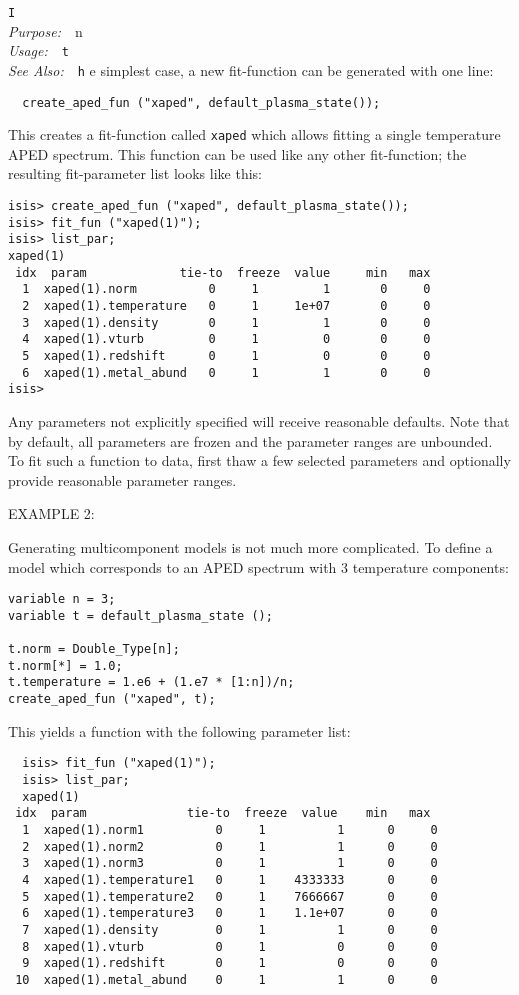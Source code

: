 \documentclass{book}
\makeatletter
\newif\ifpdf
\newenvironment{isisfunction}[4]%
{\index{{#1}@{\tt #1}}%
  \ifpdf
  \else
     \addcontentsline{toc}{subsection}{{#1} -- {#2}}
  \fi
  \vbox{
          \vspace*{\baselineskip}
          {\LARGE\tt #1}\vspace*{\baselineskip}\\
          {{\it Purpose:}~~{#2}}\\
          {{\it Usage:}~~{\tt #3}}\\
          {{\it See Also:}~~{\tt #4}}
       }
}%
{ }
\makeatother
\begin{document}
\begin{isisfunction}
In the simplest case, a new fit-function can
be generated with one line:
\begin{verbatim}
  create_aped_fun ("xaped", default_plasma_state());
\end{verbatim}
This creates a fit-function called \verb|xaped| which allows
fitting a single temperature APED spectrum.  This function can be
used like any other fit-function; the resulting fit-parameter list
looks like this:
\begin{verbatim}
isis> create_aped_fun ("xaped", default_plasma_state());
isis> fit_fun ("xaped(1)");
isis> list_par;
xaped(1)
 idx  param             tie-to  freeze  value     min   max
  1  xaped(1).norm          0     1         1       0     0
  2  xaped(1).temperature   0     1     1e+07       0     0
  3  xaped(1).density       0     1         1       0     0
  4  xaped(1).vturb         0     1         0       0     0
  5  xaped(1).redshift      0     1         0       0     0
  6  xaped(1).metal_abund   0     1         1       0     0
isis>
\end{verbatim}
Any parameters not explicitly specified will receive reasonable
defaults. Note that by default, all parameters are frozen and the
parameter ranges are unbounded.  To fit such a function
to data, first thaw a few selected parameters and optionally
provide reasonable parameter ranges.

EXAMPLE 2:

Generating multicomponent models is not much more complicated. To
define a model which corresponds to an APED spectrum with 3
temperature components:
\begin{verbatim}
variable n = 3;
variable t = default_plasma_state ();

t.norm = Double_Type[n];
t.norm[*] = 1.0;
t.temperature = 1.e6 + (1.e7 * [1:n])/n;
create_aped_fun ("xaped", t);
\end{verbatim}

This yields a function with the following parameter list:
\begin{verbatim}
  isis> fit_fun ("xaped(1)");
  isis> list_par;
  xaped(1)
 idx  param              tie-to  freeze  value    min   max
  1  xaped(1).norm1          0     1          1      0     0
  2  xaped(1).norm2          0     1          1      0     0
  3  xaped(1).norm3          0     1          1      0     0
  4  xaped(1).temperature1   0     1    4333333      0     0
  5  xaped(1).temperature2   0     1    7666667      0     0
  6  xaped(1).temperature3   0     1    1.1e+07      0     0
  7  xaped(1).density        0     1          1      0     0
  8  xaped(1).vturb          0     1          0      0     0
  9  xaped(1).redshift       0     1          0      0     0
 10  xaped(1).metal_abund    0     1          1      0     0
\end{verbatim}


\end{isisfunction}
\end{document}
